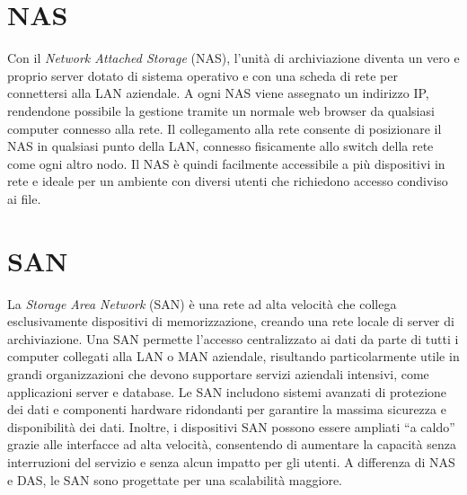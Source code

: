 \documentclass[12pt]{report}
\begin{document}
	\section{NAS}
	Con il \textit{Network Attached Storage} (NAS), l’unità di archiviazione diventa un vero e proprio server dotato di sistema operativo e con una scheda di rete per connettersi alla LAN aziendale. A ogni NAS viene assegnato un indirizzo IP, rendendone possibile la gestione tramite un normale web browser da qualsiasi computer connesso alla rete. Il collegamento alla rete consente di posizionare il NAS in qualsiasi punto della LAN, connesso fisicamente allo switch della rete come ogni altro nodo. Il NAS è quindi facilmente accessibile a più dispositivi in rete e ideale per un ambiente con diversi utenti che richiedono accesso condiviso ai file.
	
	\section{SAN}
	La \textit{Storage Area Network} (SAN) è una rete ad alta velocità che collega esclusivamente dispositivi di memorizzazione, creando una rete locale di server di archiviazione. Una SAN permette l’accesso centralizzato ai dati da parte di tutti i computer collegati alla LAN o MAN aziendale, risultando particolarmente utile in grandi organizzazioni che devono supportare servizi aziendali intensivi, come applicazioni server e database. Le SAN includono sistemi avanzati di protezione dei dati e componenti hardware ridondanti per garantire la massima sicurezza e disponibilità dei dati. Inoltre, i dispositivi SAN possono essere ampliati “a caldo” grazie alle interfacce ad alta velocità, consentendo di aumentare la capacità senza interruzioni del servizio e senza alcun impatto per gli utenti. A differenza di NAS e DAS, le SAN sono progettate per una scalabilità maggiore.
\end{document}
